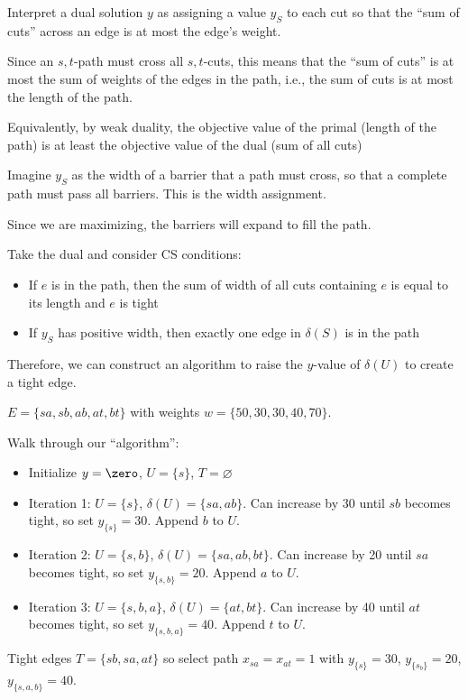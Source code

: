 Interpret a dual solution $y$ as assigning a value $y_S$ to each
cut so that the ``sum of cuts'' across an edge is at most the edge's weight.

Since an $s,t$-path must cross all $s,t$-cuts, this means that
the ``sum of cuts'' is at most the sum of weights of the edges in
the path, i.e., the sum of cuts is at most the length of the path.

Equivalently, by weak duality, the objective value of the primal
(length of the path) is at least the objective value of the dual
(sum of all cuts)

Imagine $y_S$ as the width of a barrier that a path must cross, so
that a complete path must pass all barriers. This is the width
assignment.

Since we are maximizing, the barriers will expand to fill the path.

Take the dual and consider CS conditions:
\begin{itemize}[noitemsep]
  \item If $e$ is in the path, then the sum of width of all cuts
        containing $e$ is equal to its length and $e$ is tight
  \item If $y_S$ has positive width, then exactly one edge in
        $\delta(S)$ is in the path
\end{itemize}
Therefore, we can construct an algorithm to raise the $y$-value of $\delta(U)$
to create a tight edge.

\begin{example}
  $E = \{sa, sb, ab, at, bt\}$ with weights $w = \{50,30,30,40,70\}$.
\end{example}
\begin{sol}
  Walk through our ``algorithm'':
  \begin{itemize}
    \item Initialize $y = \zero$, $U = \{s\}$, $T = \varnothing$
    \item Iteration 1: $U = \{s\}$, $\delta(U) = \{sa,ab\}$.
          Can increase by 30 until $sb$ becomes tight, so set
          $y_{\{s\}} = 30$. Append $b$ to $U$.
    \item Iteration 2: $U = \{s, b\}$, $\delta(U) = \{sa,ab,bt\}$.
          Can increase by 20 until $sa$ becomes tight, so set
          $y_{\{s,b\}} = 20$. Append $a$ to $U$.
    \item Iteration 3: $U = \{s,b,a\}$, $\delta(U) = \{at, bt\}$.
          Can increase by 40 until $at$ becomes tight, so set
          $y_{\{s,b,a\}} = 40$. Append $t$ to $U$.
  \end{itemize}
  Tight edges $T = \{sb,sa,at\}$ so select path $x_{sa}=x_{at}=1$
  with $y_{\{s\}}=30$, $y_{\{s_b\}}=20$, $y_{\{s,a,b\}}=40$.
\end{sol}

